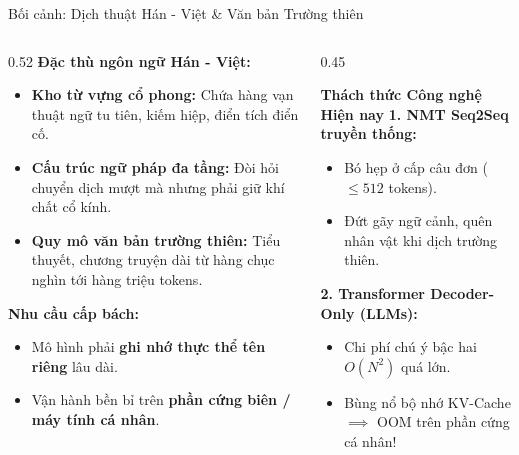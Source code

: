\documentclass[aspectratio=169, 10pt]{beamer}
\begin{document}
\begin{frame}{Bối cảnh: Dịch thuật Hán - Việt \& Văn bản Trường thiên}
  \begin{columns}
    \begin{column}{0.52\textwidth}
      \textbf{Đặc thù ngôn ngữ Hán - Việt:}
      \begin{itemize}
        \item \textbf{Kho từ vựng cổ phong:} Chứa hàng vạn thuật ngữ tu tiên, kiếm hiệp, điển tích điển cố.
        \item \textbf{Cấu trúc ngữ pháp đa tầng:} Đòi hỏi chuyển dịch mượt mà nhưng phải giữ khí chất cổ kính.
        \item \textbf{Quy mô văn bản trường thiên:} Tiểu thuyết, chương truyện dài từ hàng chục nghìn tới hàng triệu tokens.
      \end{itemize}
      \vspace{0.2cm}
      \textbf{Nhu cầu cấp bách:}
      \begin{itemize}
        \item Mô hình phải \textbf{ghi nhớ thực thể tên riêng} lâu dài.
        \item Vận hành bền bỉ trên \textbf{phần cứng biên / máy tính cá nhân}.
      \end{itemize}
    \end{column}
    \begin{column}{0.45\textwidth}
      \begin{alertblock}{\textbf{Thách thức Công nghệ Hiện nay}}
        \footnotesize
        \textbf{1. NMT Seq2Seq truyền thống:}
        \begin{itemize}
          \item Bó hẹp ở cấp câu đơn ($\le 512$ tokens).
          \item Đứt gãy ngữ cảnh, quên nhân vật khi dịch trường thiên.
        \end{itemize}
        \vspace{0.1cm}
        \textbf{2. Transformer Decoder-Only (LLMs):}
        \begin{itemize}
          \item Chi phí chú ý bậc hai $O(N^2)$ quá lớn.
          \item Bùng nổ bộ nhớ KV-Cache $\implies$ OOM trên phần cứng cá nhân!
        \end{itemize}
      \end{alertblock}
    \end{column}
  \end{columns}
\end{frame}
\end{document}
